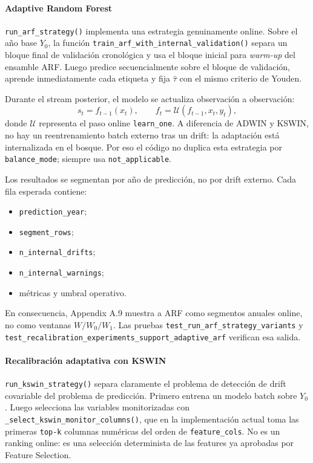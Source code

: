 \paragraph{Adaptive Random Forest}
\texttt{run\_arf\_strategy()} implementa una estrategia genuinamente online. Sobre el a\~no base \(Y_0\), la funci\'on \texttt{train\_arf\_with\_internal\_validation()} separa un bloque final de validaci\'on cronol\'ogica y usa el bloque inicial para \textit{warm-up} del ensamble ARF. Luego predice secuencialmente sobre el bloque de validaci\'on, aprende inmediatamente cada etiqueta y fija \(\hat{\tau}\) con el mismo criterio de Youden.

Durante el stream posterior, el modelo se actualiza observaci\'on a observaci\'on:
\[
s_t = f_{t-1}(x_t),
\qquad
f_t = \mathcal{U}(f_{t-1}, x_t, y_t),
\]
donde \(\mathcal{U}\) representa el paso online \texttt{learn\_one}. A diferencia de ADWIN y KSWIN, no hay un reentrenamiento batch externo tras un drift: la adaptaci\'on est\'a internalizada en el bosque. Por eso el c\'odigo no duplica esta estrategia por \texttt{balance\_mode}; siempre usa \texttt{not\_applicable}.

Los resultados se segmentan por a\~no de predicci\'on, no por drift externo. Cada fila esperada contiene:
\begin{itemize}[leftmargin=*]
  \item \texttt{prediction\_year};
  \item \texttt{segment\_rows};
  \item \texttt{n\_internal\_drifts};
  \item \texttt{n\_internal\_warnings};
  \item m\'etricas y umbral operativo.
\end{itemize}
En consecuencia, Appendix A.9 muestra a ARF como segmentos anuales online, no como ventanas \(W/W_0/W_1\). Las pruebas \texttt{test\_run\_arf\_strategy\_variants} y \texttt{test\_recalibration\_experiments\_support\_adaptive\_arf} verifican esa salida.

\paragraph{Recalibraci\'on adaptativa con KSWIN}
\texttt{run\_kswin\_strategy()} separa claramente el problema de detecci\'on de drift covariable del problema de predicci\'on. Primero entrena un modelo batch sobre \(Y_0\). Luego selecciona las variables monitorizadas con \texttt{\_select\_kswin\_monitor\_columns()}, que en la implementaci\'on actual toma las primeras \texttt{top-k} columnas num\'ericas del orden de \texttt{feature\_cols}. No es un ranking online: es una selecci\'on determinista de las features ya aprobadas por Feature Selection.

